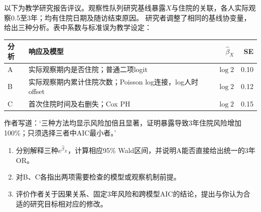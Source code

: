 以下为教学研究报告评议。观察性队列研究基线暴露$X$与住院的关联，各人实际观察0.5至3年；均有住院日期及随访结束原因。
研究者调整了相同的基线协变量，给出三种分析。表中系数与标准误为教学设定：
\begin{center}\small\begin{tabular}{p{.09\linewidth}p{.54\linewidth}rr}\toprule
分析&响应及模型&$\hat\beta_X$&SE\\\midrule
A&实际观察期内是否住院；普通二项logit&$\log2$&0.10\\
B&实际观察期内累计住院次数；Poisson log连接，log人时offset&$\log2$&0.12\\
C&首次住院时间及右删失；Cox PH&$\log2$&0.15\\\bottomrule\end{tabular}\end{center}
作者写道：‘三种方法均显示风险加倍且显著，证明暴露导致3年住院风险增加100\%；只须选择三者中AIC最小者。’
\begin{enumerate}
\item 分别解释三种$e^{\hat\beta_X}$，计算相应95\% Wald区间，并说明A能否直接给出统一的3年OR。
\item 对B、C各指出两项需要检查的模型或观察机制前提。
\item 评价作者关于因果关系、固定3年风险和跨模型AIC的结论，提出与你认为合适的研究目标相对应的修改。
\end{enumerate}
